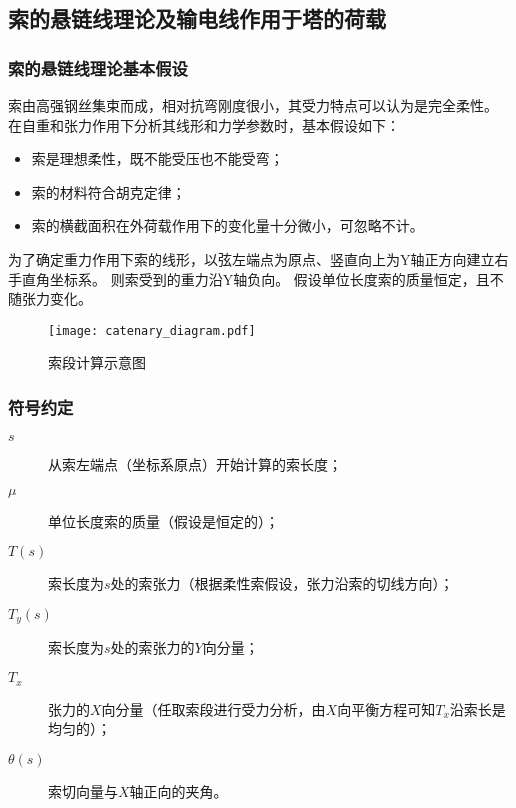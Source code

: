 \subsection{索的悬链线理论及输电线作用于塔的荷载}

\subsubsection{索的悬链线理论基本假设}
索由高强钢丝集束而成，相对抗弯刚度很小，其受力特点可以认为是完全柔性。
在自重和张力作用下分析其线形和力学参数时，基本假设如下：
\begin{itemize}
	\item
	      索是理想柔性，既不能受压也不能受弯；
	\item
	      索的材料符合胡克定律；
	\item
	      索的横截面积在外荷载作用下的变化量十分微小，可忽略不计。
\end{itemize}

为了确定重力作用下索的线形，以弦左端点为原点、竖直向上为Y轴正方向建立右手直角坐标系。
则索受到的重力沿Y轴负向。
假设单位长度索的质量恒定，且不随张力变化。

\begin{figure}[!htbp]
	\centering
	\texttt{[image: catenary\_diagram.pdf]}
	\label{fig:catenary}
	\caption{索段计算示意图}
\end{figure}

\subsubsection{符号约定}
\begin{description}
	\item[$s$]
	从索左端点（坐标系原点）开始计算的索长度；
	\item[$\mu$]
	单位长度索的质量（假设是恒定的）；
	\item[$T(s)$]
	索长度为$s$处的索张力（根据柔性索假设，张力沿索的切线方向）；
	\item[$T_y(s)$]
	索长度为$s$处的索张力的$Y$向分量；
	\item[$T_x$]
	张力的$X$向分量（任取索段进行受力分析，由$X$向平衡方程可知$T_x$沿索长是均匀的）；
	\item[$\theta(s)$]
	索切向量与$X$轴正向的夹角。
\end{description}

